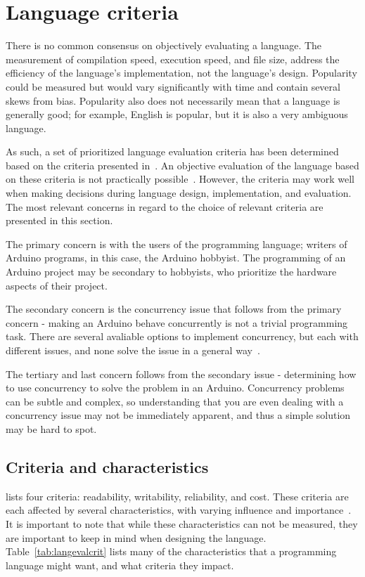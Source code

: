 \section{Language criteria}\label{sec:languageeval}
There is no common consensus on objectively evaluating a language. The measurement of compilation speed, execution speed, and file size, address the efficiency of the language's implementation, not the language's design. Popularity could be measured but would vary significantly with time and contain several skews from bias. Popularity also does not necessarily mean that a language is generally good; for example, English is popular, but it is also a very ambiguous language.

As such, a set of prioritized language evaluation criteria has been determined based on the criteria presented in~\cite{Sebesta2016}. An objective evaluation of the language based on these criteria is not practically possible~\cite{Sebesta2016}. However, the criteria may work well when making decisions during language design, implementation, and evaluation. The most relevant concerns in regard to the choice of relevant criteria are presented in this section.

The primary concern is with the users of the programming language; writers of Arduino programs, in this case, the Arduino hobbyist. The programming of an Arduino project may be secondary to hobbyists, who prioritize the hardware aspects of their project.

The secondary concern is the concurrency issue that follows from the primary concern - making an Arduino behave concurrently is not a trivial programming task. There are several avaliable options to implement concurrency, but each with different issues, and none solve the issue in a general way~\cite{Restucia2022}.

The tertiary and last concern follows from the secondary issue - determining how to use concurrency to solve the problem in an Arduino. Concurrency problems can be subtle and complex, so understanding that you are even dealing with a concurrency issue may not be immediately apparent, and thus a simple solution may be hard to spot.

\subsection{Criteria and characteristics}\label{subsec:priorityofcriteria}
 lists four criteria: readability, writability, reliability, and cost. These criteria are each affected by several characteristics, with varying influence and importance~\cite{Sebesta2016}. It is important to note that while these characteristics can not be measured, they are important to keep in mind when designing the language. Table~\ref{tab:langevalcrit} lists many of the characteristics that a programming language might want, and what criteria they impact.


